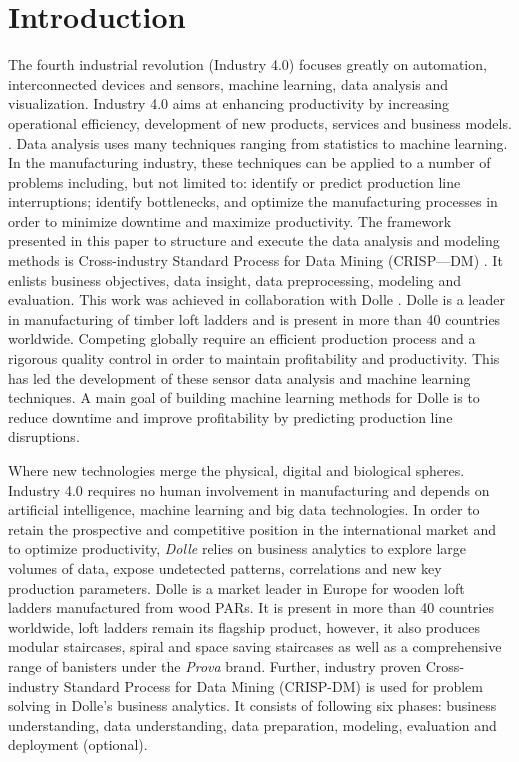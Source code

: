 \documentclass[runningheads]{llncs}
\begin{document}
\section{Introduction}
The fourth industrial revolution (Industry 4.0) focuses greatly on automation, interconnected devices and sensors, machine learning, data analysis and visualization. Industry 4.0 aims at enhancing productivity by increasing operational efficiency, development of new products, services and business models. \cite{industry}. 
Data analysis uses many techniques ranging from statistics to machine learning. In the manufacturing industry, these techniques can be applied to a number  of problems including, but not limited to: identify or predict production line interruptions; identify bottlenecks, and optimize the manufacturing processes in order to minimize downtime and maximize productivity. The framework presented in this paper to structure and execute the data analysis and modeling methods is Cross-industry Standard Process for Data Mining (CRISP—DM) \cite{CRM}. 
It enlists business objectives, data insight, data preprocessing, modeling and evaluation. This work was achieved in collaboration with Dolle \cite{Dolle}. 
Dolle is a leader in manufacturing of timber loft ladders and is present in more than 40 countries worldwide. Competing globally require an efficient production process and a rigorous quality control in order to maintain profitability and productivity. This has led the development of these sensor data analysis and machine learning techniques. A main goal of building machine learning methods for Dolle is to reduce downtime and improve profitability by predicting production line disruptions.



\iffalse
 Where new technologies merge the physical, digital and biological spheres. Industry 4.0 requires no human involvement in manufacturing and depends on artificial intelligence, machine learning and big data technologies. In order to retain the prospective and competitive position in the international market and to optimize productivity, \textit{Dolle} \cite{Dolle} relies on business analytics to explore large volumes of data, expose undetected patterns, correlations and new key production parameters. Dolle is a market leader in Europe for wooden loft ladders manufactured from wood PARs. It is present in more than 40 countries worldwide, loft ladders remain its flagship product, however, it also produces modular staircases, spiral and space saving staircases as well as a comprehensive range of banisters under the \textit{Prova} brand. Further, industry proven Cross-industry Standard Process for Data Mining (CRISP-DM) \cite{CRM} is used for problem solving in Dolle's business analytics. It consists of following six phases: business understanding, data understanding, data preparation, modeling, evaluation and deployment (optional). 
\end{document}
